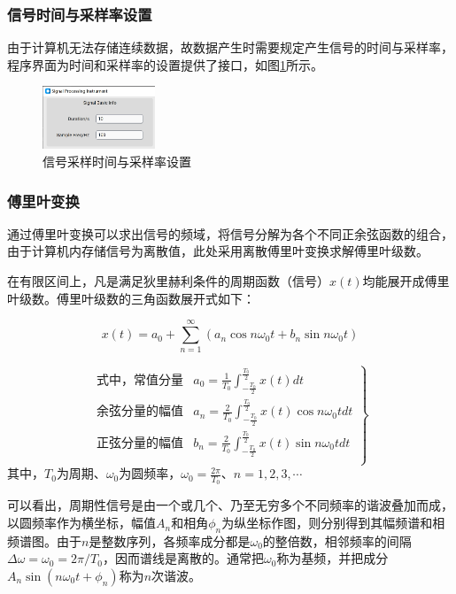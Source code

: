 \documentclass[12pt]{ctexart}
\begin{document}
\subsubsection{信号时间与采样率设置}

由于计算机无法存储连续数据，故数据产生时需要规定产生信号的时间与采样率，程序界面为时间和采样率的设置提供了接口，如图\ref{figure2}所示。
\begin{figure}[h]
  \centering
  \includegraphics[width=0.3\textwidth]{img/signal_basic_info.png}
  \caption{信号采样时间与采样率设置}\label{figure2}
\end{figure}


\subsubsection{傅里叶变换}

通过傅里叶变换可以求出信号的频域，将信号分解为各个不同正余弦函数的组合，由于计算机内存储信号为离散值，此处采用离散傅里叶变换求解傅里叶级数。

在有限区间上，凡是满足狄里赫利条件的周期函数（信号）$x(t)$均能展开成傅里叶级数。傅里叶级数的三角函数展开式如下：

\begin{equation}
  x(t)=a_0+\sum_{n=1}^\infty \left(a_n \cos n\omega_0t+b_n\sin n\omega_0t\right)
\end{equation}

\begin{equation}
  \renewcommand\arraystretch{2}
  \left.\begin{matrix}
    \text{式中，常值分量} & a_0=\frac{1}{T_0}\int_{-\frac{T_0}{2}}^{\frac{T_0}{2}}x(t)dt                \\
    \text{余弦分量的幅值} & a_n=\frac{2}{T_0}\int_{-\frac{T_0}{2}}^{\frac{T_0}{2}}x(t)\cos n\omega_0tdt \\
    \text{正弦分量的幅值} & b_n=\frac{2}{T_0}\int_{-\frac{T_0}{2}}^{\frac{T_0}{2}}x(t)\sin n\omega_0tdt \\
  \end{matrix}\right\}
\end{equation}
其中，$T_0$为周期、$\omega_0$为圆频率，$\displaystyle \omega_0=\frac{2\pi}{T_0}$、$n=1,2,3,\cdots$

可以看出，周期性信号是由一个或几个、乃至无穷多个不同频率的谐波叠加而成，以圆频率作为横坐标，幅值$A_n$和相角$\phi_n$为纵坐标作图，则分别得到其幅频谱和相频谱图。由于$n$是整数序列，各频率成分都是$\omega_0$的整倍数，相邻频率的间隔$\Delta \omega=\omega_0=2\pi/T_0$，因而谱线是离散的。通常把$\omega_0$称为基频，并把成分$A_n\sin(n\omega_0t+\phi_n)$称为$n$次谐波。
\end{document}
